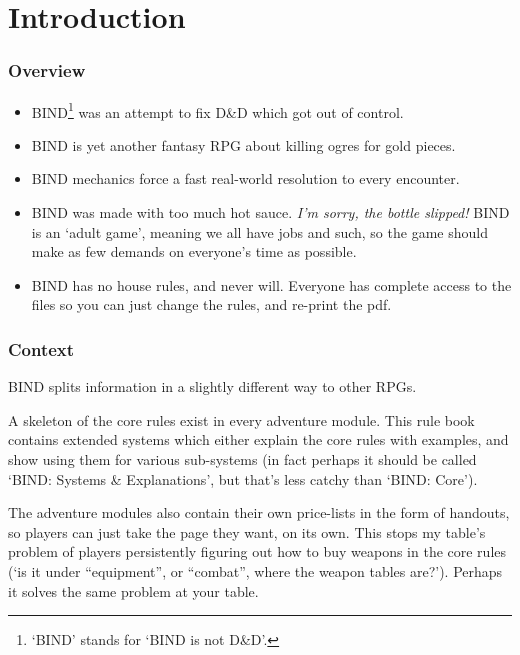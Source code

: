 \chapter*{Introduction}

\begin{multicols}{2}

\subsection*{Overview}

\begin{itemize}
  \item
  BIND\footnote{`BIND' stands for `BIND is not D\&D'.} was an attempt to fix D\&D which got out of control.
  \item
  BIND is yet another fantasy RPG about killing ogres for gold pieces.
  \item
  BIND mechanics force a fast real-world resolution to every encounter.
  \item
  \ifnum{}
    BIND was made with too much hot sauce.
    \emph{I'm sorry, the bottle slipped!}
  \else
  BIND is an `adult game', meaning we all have jobs and such, so the game should make as few demands on everyone's time as possible.
  \fi
  \item
  BIND has no house rules, and never will.
  Everyone has complete access to the files so you can just change the rules, and re-print the \gls{pdf}.
\end{itemize}

\subsection*{Context}

BIND splits information in a slightly different way to other RPGs.

A skeleton of the core rules exist in every adventure module.
This rule book contains extended systems which either explain the core rules with examples, and show using them for various sub-systems (in fact perhaps it should be called `BIND: Systems \& Explanations', but that's less catchy than `BIND: Core').

The adventure modules also contain their own price-lists in the form of handouts, so players can just take the page they want, on its own.
This stops my table's problem of players persistently figuring out how to buy weapons in the core rules (`is it under ``equipment'', or ``combat'', where the weapon tables are?').
Perhaps it solves the same problem at your table.


\end{multicols}
